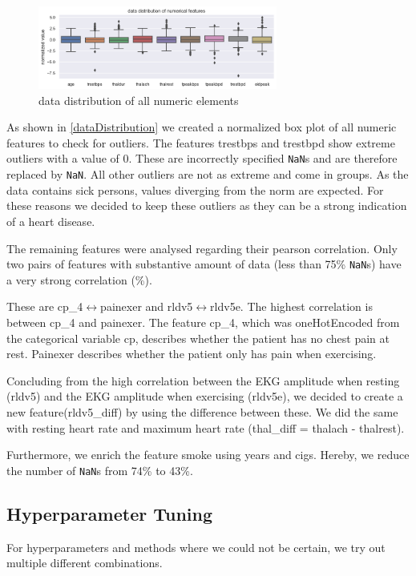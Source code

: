 \begin{figure}[h]
	\centering
	\includegraphics[width=0.7\textwidth]{images/dataDistribution.png}
	\caption{data distribution of all numeric elements}
	\label{fig:dataDistribution}
\end{figure}
As shown in \ref{dataDistribution} we created a normalized box plot of all numeric features to check for outliers. The features trestbps and trestbpd show extreme outliers with a value of 0. These are incorrectly specified \texttt{NaN}s and are therefore replaced by \texttt{NaN}. All other outliers are not as extreme and come in groups. As the data contains sick persons, values diverging from the norm are expected. For these reasons we decided to keep these outliers as they can be a strong indication of a heart disease.

The remaining features were analysed regarding their pearson correlation. Only two pairs of features with substantive amount of data (less than 75\% \texttt{NaN}s) have a very strong correlation (\%).  

These are cp\_4$\leftrightarrow$painexer and rldv5$\leftrightarrow$rldv5e. The highest correlation is between cp\_4 and painexer. The feature cp\_4, which was oneHotEncoded from the categorical variable cp, describes whether the patient has no chest pain at rest. Painexer describes whether the patient only has pain when exercising. 

Concluding from the high correlation between the EKG amplitude when resting (rldv5) and the EKG amplitude when exercising (rldv5e), we decided to create a new feature(rldv5\_diff) by using the difference between these. We did the same with resting heart rate and maximum heart rate (thal\_diff = thalach - thalrest). 

Furthermore, we enrich the feature smoke using years and cigs. Hereby, we reduce the number of \texttt{NaN}s from 74\% to 43\%. 

\subsection{Hyperparameter Tuning }
For hyperparameters and methods where we could not be certain, we try out multiple different combinations.

